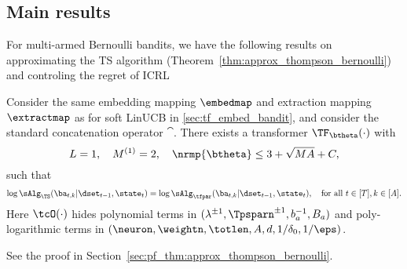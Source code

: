 \subsection{Main results}
For multi-armed Bernoulli bandits, we have the following results on approximating the TS algorithm (Theorem~\ref{thm:approx_thompson_bernoulli}) and controling the regret of ICRL  



\begin{theorem}\label{thm:approx_thompson_bernoulli}
Consider the same embedding mapping $\embedmap$ and extraction mapping $\extractmap$ as for soft LinUCB in \ref{sec:tf_embed_bandit},
and consider the standard concatenation operator $\cat$. There exists a  transformer $\TF_\btheta(\cdot)$ with 
$$L=1,~~~M^{(1)}=2,~~~ \nrmp{\btheta}\leq 3+\sqrt{ M A}+C,$$  
such that 
\[
\log \sAlg_{\TS}(\ba_{t,k}|\dset_{t-1},\state_t) = \log \sAlg_{\tfpar}(\ba_{t,k}|\dset_{t-1},\state_t) , ~~~ \text{for all } t\in[T],k\in[A].
\]
Here $\tcO(\cdot)$ hides polynomial terms in $(\lambda^{\pm1},\Tpsparn^{\pm1},b_a^{-1},B_a)$ and poly-logarithmic terms in $(\neuron,\weightn,\totlen,A,d,1/\delta_0,1/\eps)$.
\end{theorem}





See the proof in Section~\ref{sec:pf_thm:approx_thompson_bernoulli}.












